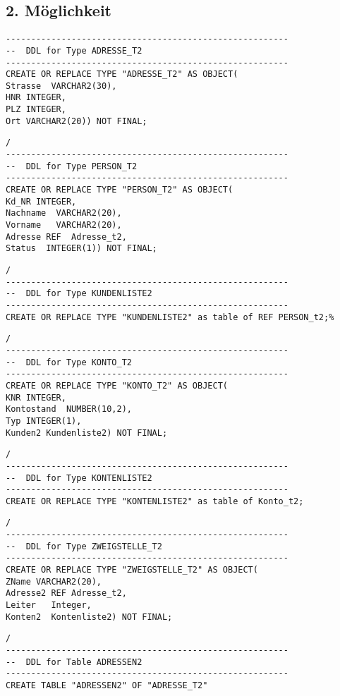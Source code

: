 \documentclass{scrartcl}
\begin{document}
\subsection*{2. Möglichkeit}
\begin{lstlisting}
--------------------------------------------------------
--  DDL for Type ADRESSE_T2
--------------------------------------------------------
CREATE OR REPLACE TYPE "ADRESSE_T2" AS OBJECT(
Strasse  VARCHAR2(30),
HNR INTEGER,
PLZ INTEGER,
Ort VARCHAR2(20)) NOT FINAL;
\end{lstlisting}
\begin{lstlisting}
/
--------------------------------------------------------
--  DDL for Type PERSON_T2
--------------------------------------------------------
CREATE OR REPLACE TYPE "PERSON_T2" AS OBJECT(
Kd_NR INTEGER,
Nachname  VARCHAR2(20),
Vorname   VARCHAR2(20),
Adresse REF  Adresse_t2,
Status  INTEGER(1)) NOT FINAL;
\end{lstlisting}
\begin{lstlisting}
/
--------------------------------------------------------
--  DDL for Type KUNDENLISTE2
--------------------------------------------------------
CREATE OR REPLACE TYPE "KUNDENLISTE2" as table of REF PERSON_t2;%
\end{lstlisting}
\begin{lstlisting}
/
--------------------------------------------------------
--  DDL for Type KONTO_T2
--------------------------------------------------------
CREATE OR REPLACE TYPE "KONTO_T2" AS OBJECT(
KNR INTEGER,
Kontostand  NUMBER(10,2),
Typ INTEGER(1),
Kunden2 Kundenliste2) NOT FINAL;
\end{lstlisting}
\begin{lstlisting}
/
--------------------------------------------------------
--  DDL for Type KONTENLISTE2
--------------------------------------------------------
CREATE OR REPLACE TYPE "KONTENLISTE2" as table of Konto_t2;
\end{lstlisting}
\begin{lstlisting}
/
--------------------------------------------------------
--  DDL for Type ZWEIGSTELLE_T2
--------------------------------------------------------
CREATE OR REPLACE TYPE "ZWEIGSTELLE_T2" AS OBJECT(
ZName VARCHAR2(20),
Adresse2 REF Adresse_t2,
Leiter   Integer,
Konten2  Kontenliste2) NOT FINAL;
\end{lstlisting}
\begin{lstlisting}
/
--------------------------------------------------------
--  DDL for Table ADRESSEN2
--------------------------------------------------------
CREATE TABLE "ADRESSEN2" OF "ADRESSE_T2" 
\end{lstlisting}
\end{document}
